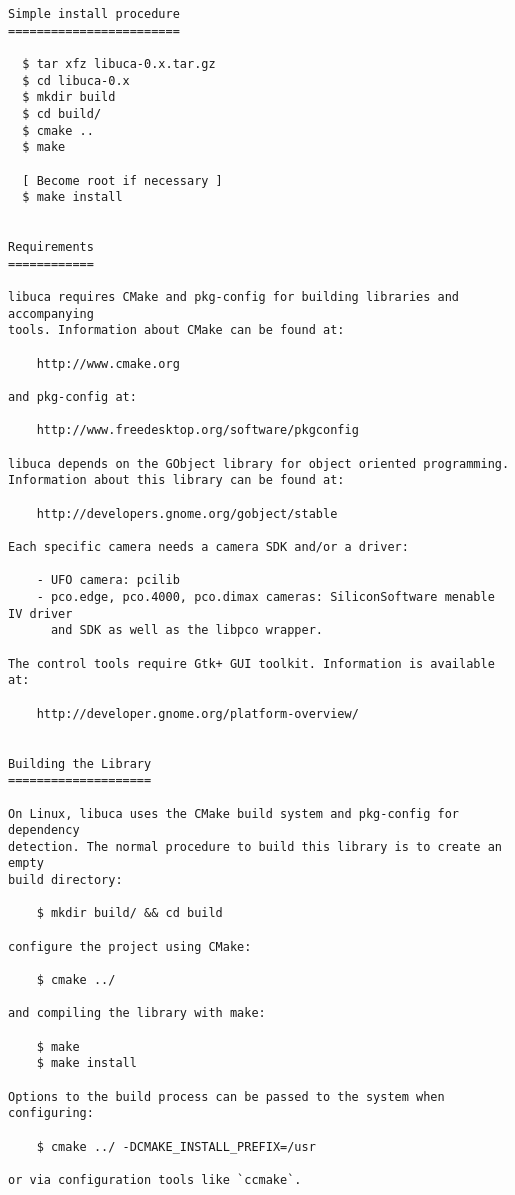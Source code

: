 \begin{verbatim}
Simple install procedure
========================

  $ tar xfz libuca-0.x.tar.gz
  $ cd libuca-0.x
  $ mkdir build
  $ cd build/
  $ cmake ..
  $ make

  [ Become root if necessary ]
  $ make install


Requirements
============

libuca requires CMake and pkg-config for building libraries and accompanying
tools. Information about CMake can be found at:

    http://www.cmake.org

and pkg-config at:

    http://www.freedesktop.org/software/pkgconfig

libuca depends on the GObject library for object oriented programming.
Information about this library can be found at:

    http://developers.gnome.org/gobject/stable

Each specific camera needs a camera SDK and/or a driver:

    - UFO camera: pcilib
    - pco.edge, pco.4000, pco.dimax cameras: SiliconSoftware menable IV driver
      and SDK as well as the libpco wrapper.

The control tools require Gtk+ GUI toolkit. Information is available at:

    http://developer.gnome.org/platform-overview/


Building the Library
====================

On Linux, libuca uses the CMake build system and pkg-config for dependency
detection. The normal procedure to build this library is to create an empty
build directory:

    $ mkdir build/ && cd build

configure the project using CMake:

    $ cmake ../

and compiling the library with make:

    $ make
    $ make install

Options to the build process can be passed to the system when configuring:

    $ cmake ../ -DCMAKE_INSTALL_PREFIX=/usr

or via configuration tools like `ccmake`.
\end{verbatim}


